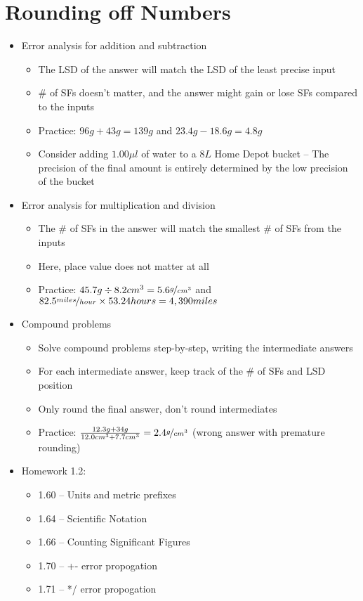 \documentclass[12pt, openany, letterpaper]{memoir}
\begin{document}
\section{Rounding off Numbers}
\begin{itemize}
	\item Error analysis for addition and subtraction
	\begin{itemize}
		\item The LSD of the answer will match the LSD of the least precise input
		\item \# of SFs doesn't matter, and the answer might gain or lose SFs compared to the inputs 
		\item Practice: $96g+43g=139g$ \hspace{1em}and\hspace{1em} $23.4g-18.6g=4.8g$
		\item Consider adding $1.00\mu l$ of water to a $8L$ Home Depot bucket -- The precision of the final amount is entirely determined by the low precision of the bucket 
	\end{itemize}
	\item Error analysis for multiplication and division
	\begin{itemize}
		\item The \# of SFs in the answer will match the smallest \# of SFs from the inputs
		\item Here, place value does not matter at all
		\item Practice: $45.7g \div 8.2cm^3 = 5.6\nicefrac{g}{cm^3}$ \hspace{1em}and\hspace{1em} $82.5\nicefrac{miles}{hour}\times53.24hours=4,390miles$
	\end{itemize}
	\item Compound problems
	\begin{itemize}
		\item Solve compound problems step-by-step, writing the intermediate answers
		\item For each intermediate answer, keep track of the \# of SFs and LSD position
		\item Only round the final answer, don't round intermediates
		\item Practice: $\frac{12.3g+34g}{12.0cm^3+7.7cm^3}=2.4\nicefrac{g}{cm^3}$ (wrong answer with premature rounding)
	\end{itemize}
	\item Homework 1.2:
	\begin{itemize}
		\item 1.60 -- Units and metric prefixes
		\item 1.64 -- Scientific Notation
		\item 1.66 -- Counting Significant Figures
		\item 1.70 -- +- error propogation
		\item 1.71 -- */ error propogation	
	\end{itemize}
\end{itemize}
\end{document}
